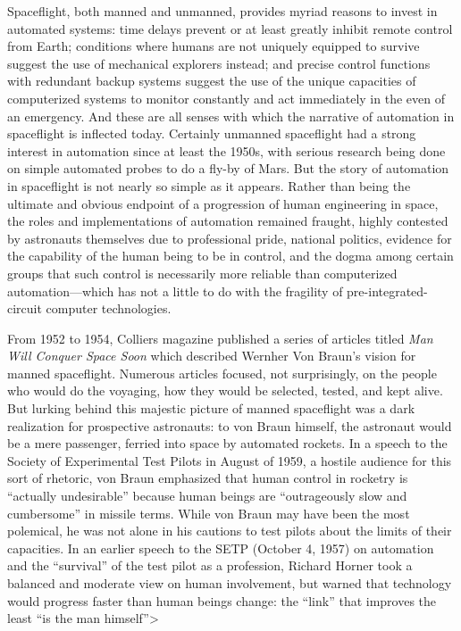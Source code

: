 Spaceflight, both manned and unmanned, provides myriad reasons to
invest in automated systems: time delays prevent or at least greatly
inhibit remote control from Earth; conditions where humans are not
uniquely equipped to survive suggest the use of mechanical explorers
instead; and precise control functions with redundant backup systems
suggest the use of the unique capacities of computerized systems to
monitor constantly and act immediately in the even of an emergency.
And these are all senses with which the narrative of automation in
spaceflight is inflected today. Certainly unmanned spaceflight had a
strong interest in automation since at least the 1950s, with serious
research being done on simple automated probes to do a fly-by of
Mars.\cite{???-DMsclass} But the story of automation in spaceflight is
not nearly so simple as it appears. Rather than being the ultimate and
obvious endpoint of a progression of human engineering in space, the
roles and implementations of automation remained fraught, highly
contested by astronauts themselves due to professional pride, national
politics, evidence for the capability of the human being to be in
control, and the dogma among certain groups that such control is
necessarily more reliable than computerized automation---which has not
a little to do with the fragility of pre-integrated-circuit computer
technologies.

From 1952 to 1954, Colliers magazine published a series of articles
titled \emph{Man Will Conquer Space Soon} which described Wernher Von
Braun's vision for manned spaceflight.\cite{???-wiki} Numerous
articles focused, not surprisingly, on the people who would do the
voyaging, how they would be selected, tested, and kept alive. But
lurking behind this majestic picture of manned spaceflight was a dark
realization for prospective astronauts: to von Braun himself, the
astronaut would be a mere passenger, ferried into space by automated
rockets. In a speech to the Society of Experimental Test Pilots in
August of 1959, a hostile audience for this sort of rhetoric, von
Braun emphasized that human control in rocketry is ``actually
undesirable'' because human beings are ``outrageously slow and
cumbersome'' in missile terms.\cite[p. 66-67]{???-DM} While von Braun
may have been the most polemical, he was not alone in his cautions to
test pilots about the limits of their capacities.
In an earlier speech to the SETP (October 4, 1957) on automation and
the ``survival'' of the test pilot as a profession, Richard Horner
took a balanced and moderate view on human involvement, but warned
that technology would progress faster than human beings change:
the ``link'' that improves the least ``is the man himself''\cite[p. 19]{???-DM}>

